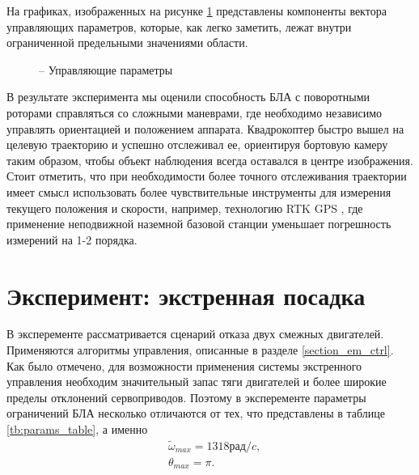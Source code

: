 На графиках, изображенных на рисунке \ref{fig:mau_ctrl_out} представлены компоненты вектора управляющих параметров, которые, как легко заметить, лежат внутри ограниченной предельными значениями области.

\begin{figure}[H]
	\centering
	
	\caption{ -- Управляющие параметры}
	\label{fig:mau_ctrl_out}
	
\end{figure}


В результате эксперимента мы оценили способность БЛА с поворотными роторами справляться со сложными маневрами, где необходимо независимо управлять ориентацией и положением аппарата. Квадрокоптер быстро вышел на целевую траекторию и успешно отслеживал ее, ориентируя бортовую камеру таким образом, чтобы объект наблюдения всегда оставался в центре изображения.
Стоит отметить, что при необходимости более точного отслеживания траектории имеет смысл использовать более чувствительные инструменты для измерения текущего положения и скорости, например, технологию RTK GPS \cite{Feng01}, где применение неподвижной наземной базовой станции уменьшает погрешность измерений на 1-2 порядка.


\section{Эксперимент: экстренная посадка}

В эксперементе рассматривается сценарий отказа двух смежных двигателей. Применяются алгоритмы управления, описанные в разделе \ref{section_em_ctrl}. Как было отмечено, для возможности применения системы экстренного управления необходим значительный запас тяги двигателей и более широкие пределы отклонений сервоприводов. Поэтому в эксперементе параметры ограничений БЛА несколько отличаются от тех, что представлены в таблице \ref{tb:params_table}, а именно
\begin{equation}
\begin{aligned}
&\tilde{\omega}_{max} = 1318 рад/c,
\\
&\theta_{max} = \pi.
\end{aligned}
\end{equation}

